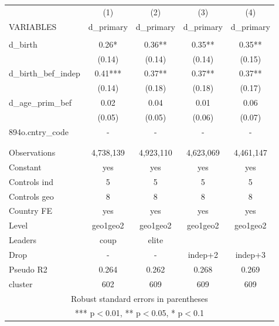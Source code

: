 \documentclass[]{article}
\begin{document}
\begin{tabular}{lcccc} \hline
 & (1) & (2) & (3) & (4) \\
VARIABLES & d\_primary & d\_primary & d\_primary & d\_primary \\ \hline
 &  &  &  &  \\
d\_birth & 0.26* & 0.36** & 0.35** & 0.35** \\
 & (0.14) & (0.14) & (0.14) & (0.15) \\
d\_birth\_bef\_indep & 0.41*** & 0.37** & 0.37** & 0.37** \\
 & (0.14) & (0.18) & (0.18) & (0.17) \\
d\_age\_prim\_bef & 0.02 & 0.04 & 0.01 & 0.06 \\
 & (0.05) & (0.05) & (0.06) & (0.07) \\
894o.cntry\_code & - & - & - & - \\
 &  &  &  &  \\
 &  &  &  &  \\
Observations & 4,738,139 & 4,923,110 & 4,623,069 & 4,461,147 \\
Constant & yes & yes & yes & yes \\
Controls ind & 5 & 5 & 5 & 5 \\
Controls geo & 8 & 8 & 8 & 8 \\
Country FE & yes & yes & yes & yes \\
Level & geo1geo2 & geo1geo2 & geo1geo2 & geo1geo2 \\
Leaders & coup & elite &  &  \\
Drop & - & - & indep+2 & indep+3 \\
Pseudo R2 & 0.264 & 0.262 & 0.268 & 0.269 \\
 cluster & 602 & 609 & 609 & 609 \\ \hline
\multicolumn{5}{c}{ Robust standard errors in parentheses} \\
\multicolumn{5}{c}{ *** p$<$0.01, ** p$<$0.05, * p$<$0.1} \\
\end{tabular}
\end{document}
